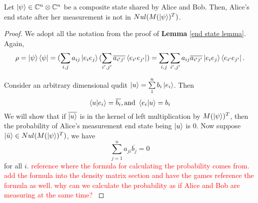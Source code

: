 \begin{prop} \label{null space}
Let $\ket{\psi} \in \mathbb{C}^n \otimes \mathbb{C}^n$ be a composite state shared by Alice and Bob.  Then, Alice's end state after her measurement is not in $Nul(M(\ket{\psi})^T)$.
\end{prop}
\begin{proof}
We adopt all the notation from the proof of {\bf{Lemma}} \ref{end state lemma}.  Again, 
\begin{gather*}
\rho=\ket{\psi}\bra{\psi}=(\sum_{i,j} a_{ij}\ket{e_i e_j}(\sum_{i',j'} \overline{a_{i'j'}}\bra{e_{i'} e_{j'}})=\sum_{i,j} \sum_{i',j'} a_{ij} \overline{a_{i'j'}}\ket{e_i e_j}\bra{e_{i'} e_{j'}}.  
\end{gather*}

Consider an arbitrary dimensional qudit $\ket{u}=\sum\limits_1^n b_i \ket{e_i}$. Then
\begin{equation} \label{eqn: null space eqn 1}
    \braket{u|e_i}=\overline{b_i}, \textrm{and }\braket{e_i|u}=b_i
\end{equation}
We will show that if $\overline{\ket{u}}$ is in the kernel of left multiplication by $M(\ket{\psi})^T$, then the probability of Alice's measurement end state being $\ket{u}$ is $0$. Now suppose
$\ket{\Bar{u}} \in Nul(M(\ket{\psi})^T)$, we have \begin{equation} \label{eqn: null space eqn 2}
\sum_{j=1}^n a_{ji} \overline{b_j}=0
\end{equation}
for all $i$.
\textcolor{red}{reference where the formula for calculating the probability comes from. add the formula into the density matrix section and have the games reference the formula as well. why can we calculate the probability as if Alice and Bob are measuring at the same time? }






\end{proof}
